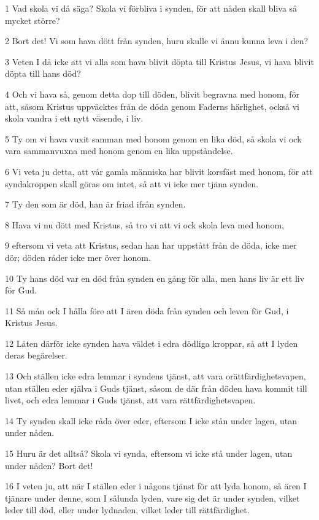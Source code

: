 \par 1 Vad skola vi då säga? Skola vi förbliva i synden, för att nåden skall bliva så mycket större?
\par 2 Bort det! Vi som hava dött från synden, huru skulle vi ännu kunna leva i den?
\par 3 Veten I då icke att vi alla som hava blivit döpta till Kristus Jesus, vi hava blivit döpta till hans död?
\par 4 Och vi hava så, genom detta dop till döden, blivit begravna med honom, för att, såsom Kristus uppväcktes från de döda genom Faderns härlighet, också vi skola vandra i ett nytt väsende, i liv.
\par 5 Ty om vi hava vuxit samman med honom genom en lika död, så skola vi ock vara sammanvuxna med honom genom en lika uppståndelse.
\par 6 Vi veta ju detta, att vår gamla människa har blivit korsfäst med honom, för att syndakroppen skall göras om intet, så att vi icke mer tjäna synden.
\par 7 Ty den som är död, han är friad ifrån synden.
\par 8 Hava vi nu dött med Kristus, så tro vi att vi ock skola leva med honom,
\par 9 eftersom vi veta att Kristus, sedan han har uppstått från de döda, icke mer dör; döden råder icke mer över honom.
\par 10 Ty hans död var en död från synden en gång för alla, men hans liv är ett liv för Gud.
\par 11 Så mån ock I hålla före att I ären döda från synden och leven för Gud, i Kristus Jesus.
\par 12 Låten därför icke synden hava väldet i edra dödliga kroppar, så att I lyden deras begärelser.
\par 13 Och ställen icke edra lemmar i syndens tjänst, att vara orättfärdighetsvapen, utan ställen eder själva i Guds tjänst, såsom de där från döden hava kommit till livet, och edra lemmar i Guds tjänst, att vara rättfärdighetsvapen.
\par 14 Ty synden skall icke råda över eder, eftersom I icke stån under lagen, utan under nåden.
\par 15 Huru är det alltså? Skola vi synda, eftersom vi icke stå under lagen, utan under nåden? Bort det!
\par 16 I veten ju, att när I ställen eder i någons tjänst för att lyda honom, så ären I tjänare under denne, som I sålunda lyden, vare sig det är under synden, vilket leder till död, eller under lydnaden, vilket leder till rättfärdighet.
